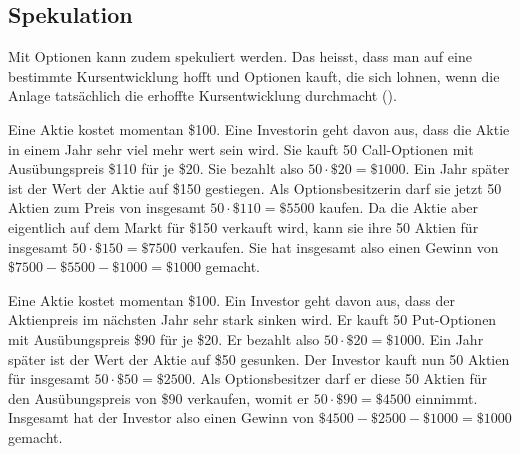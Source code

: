 \documentclass[11pt]{report} %
\begin{document}
\subsection{Spekulation}
Mit Optionen kann zudem spekuliert werden. Das heisst, dass man auf eine bestimmte Kursentwicklung hofft und Optionen kauft, die sich lohnen, wenn die Anlage tatsächlich die erhoffte Kursentwicklung durchmacht (\cite{Yates_2022}).
\begin{Beispiel}{}{}
    Eine Aktie kostet momentan \$100. Eine Investorin geht davon aus, dass die Aktie in einem Jahr sehr viel mehr wert sein wird. Sie kauft 50 Call-Optionen mit Ausübungspreis \$110 für je \$20. Sie bezahlt also $50\cdot\$20=\$1000$. Ein Jahr später ist der Wert der Aktie auf \$150 gestiegen. Als Optionsbesitzerin darf sie jetzt 50 Aktien zum Preis von insgesamt $50\cdot\$110=\$5500$ kaufen. Da die Aktie aber eigentlich auf dem Markt für \$150 verkauft wird, kann sie ihre 50 Aktien für insgesamt $50\cdot\$150=\$7500$ verkaufen. Sie hat insgesamt also einen Gewinn von $\$7500-\$5500-\$1000=\$1000$ gemacht.
\end{Beispiel}
\begin{Beispiel}{}{}
    Eine Aktie kostet momentan \$100. Ein Investor geht davon aus, dass der Aktienpreis im nächsten Jahr sehr stark sinken wird. Er kauft 50 Put-Optionen mit Ausübungspreis \$90 für je \$20. Er bezahlt also $50\cdot\$20=\$1000$. Ein Jahr später ist der Wert der Aktie auf \$50 gesunken. Der Investor kauft nun 50 Aktien für insgesamt $50\cdot\$50=\$2500$. Als Optionsbesitzer darf er diese 50 Aktien für den Ausübungspreis von \$90 verkaufen, womit er $50\cdot\$90=\$4500$ einnimmt. Insgesamt hat der Investor also einen Gewinn von $\$4500-\$2500-\$1000=\$1000$ gemacht.
\end{Beispiel}
\end{document}
